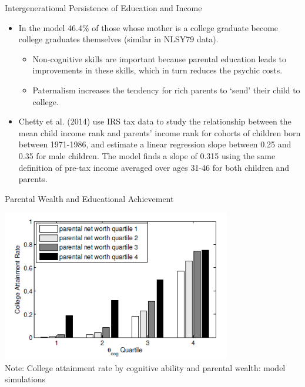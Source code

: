 \documentclass{beamer}
\begin{document}
\begin{frame}{Intergenerational Persistence of Education and Income}
\begin{itemize}
\item In the model 46.4\% of those whose mother is a college graduate become college graduates themselves (similar in NLSY79 data). %
\begin{itemize}
\item Non-cognitive skills are important because parental education leads
to improvements in these skills, which in turn reduces the psychic costs. %
\item Paternalism increases the tendency for rich parents to ‘send’ their child to college. %
\end{itemize}
\item Chetty et al. (2014) use IRS tax data to study the relationship between the mean child income rank and parents’ income rank for cohorts of children born between 1971-1986, and estimate a linear regression slope between 0.25 and 0.35 for male children.  The model finds a slope of 0.315 using the same definition of pre-tax income averaged over ages 31-46 for both children and parents. %
\end{itemize}
\end{frame}


\begin{frame}{Parental Wealth and Educational Achievement}
\begin{center}
\includegraphics[width=100mm]{Figure3.png}\\
\tiny{Note: College attainment rate by cognitive ability and parental wealth: model simulations}

\end{center}
\end{frame}
\end{document}
